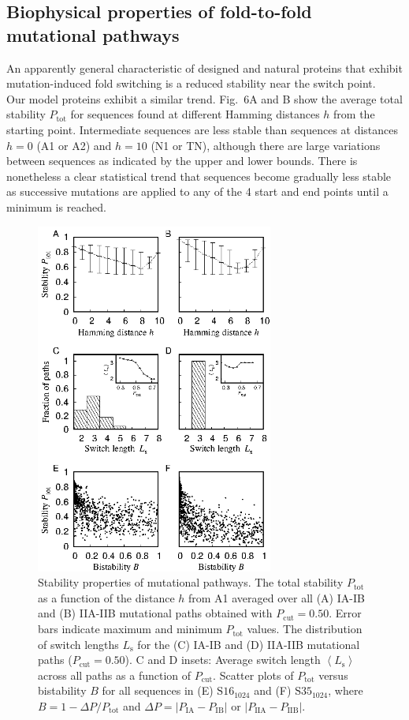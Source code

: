 \documentclass[
aip,
rsi,%
amsmath,amssymb,
reprint,%
]{revtex4-1}
\newcommand {\Pcut}     	{{P_\mathrm{cut}}}
\newcommand {\Ptot}	{{P_\mathrm{tot}}}
\newcommand {\PIA}    	{{P_\mathrm{IA}}}
\newcommand {\PIB}    	{{P_\mathrm{IB}}}
\newcommand {\PIIA}    	{{P_\mathrm{IIA}}}
\newcommand {\PIIB}    	{{P_\mathrm{IIB}}}
\newcommand {\SI}		{${\mathrm{S16}_{1024}}$}
\newcommand {\SII}		{${\mathrm{S35}_{1024}}$}
\begin{document}
\subsection{Biophysical properties of fold-to-fold mutational pathways}
\noindent 
An apparently general characteristic of designed and natural proteins that exhibit mutation-induced fold switching is a reduced stability near the switch point.~\cite{Alexander2009,He2012,Kouza2012,Sikosek2016,Sutto2012} Our model proteins exhibit a similar trend. Fig.~6A and B show the average total stability $\Ptot$ for sequences found at different Hamming distances $h$ from the starting point. Intermediate sequences are less stable than sequences at distances $h=0$ (A1 or A2) and $h=10$ (N1 or TN), although there are large variations between sequences as indicated by the upper and lower bounds. There is nonetheless a clear statistical trend that sequences become gradually less stable as successive mutations are applied to any of the 4 start and end points until a minimum is reached. 

\begin{figure}
\includegraphics[width=7.8cm]{Fig6}
\caption{Stability properties of mutational pathways. The total stability $\Ptot$ as a function of the distance $h$ from A1 averaged over all (A) IA-IB and (B) IIA-IIB mutational paths obtained with $\Pcut=0.50$. Error bars indicate maximum and minimum $\Ptot$ values. The distribution of switch lengths $L_\mathrm{s}$ for the (C) IA-IB and (D) IIA-IIB mutational paths ($\Pcut=0.50$). C and D insets: Average switch length $\left < L_\mathrm{s}\right >$ across all paths as a function of $\Pcut$. Scatter plots of $\Ptot$ versus bistability $B$ for all sequences in (E) {\SI} and (F) {\SII}, where $B=1-\Delta P/\Ptot$ and $\Delta P = |\PIA-\PIB|$ or $|\PIIA-\PIIB|$.}
\end{figure}
\end{document}
